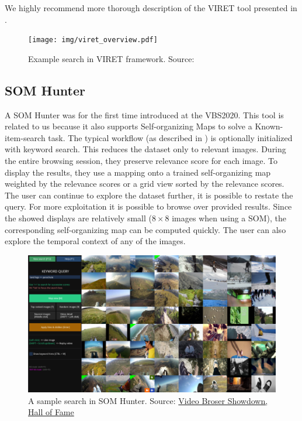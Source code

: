 We highly recommend more thorough description of the VIRET tool presented in \cite{kovalvcik2020viret}.

\begin{figure}
    \centering
    \texttt{[image: img/viret\_overview.pdf]}
    \caption{Example search in VIRET framework. Source: \cite{kovalvcik2020viret}}
    \label{fig:viret}
\end{figure}

\subsection{SOM Hunter}

A SOM Hunter was for the first time introduced at the VBS2020. This tool is related to us because it also supports Self-organizing Maps to solve a Known-item-search task. The typical workflow (as described in \cite{kratochvil2020som}) is optionally initialized with keyword search. This reduces the dataset only to relevant images. During the entire browsing session, they preserve relevance score for each image. To display the results, they use a mapping onto a trained self-organizing map weighted by the relevance scores or a grid view sorted by the relevance scores. The user can continue to explore the dataset further, it is possible to restate the query. For more exploitation it is possible to browse over provided results. Since the showed displays are relatively small ($8\times8$ images when using a SOM), the corresponding self-organizing map can be computed quickly. The user can also explore the temporal context of any of the images.


\begin{figure}
    \centering
    \includegraphics[width=0.99\linewidth]{img/som_hunter_small.png}
    \caption{A sample search in SOM Hunter. Source: \href{https://videobrowsershowdown.org/hall-of-fame/}{Video Broser Showdown, Hall of Fame}}
    \label{fig:som_hunter}
\end{figure}

